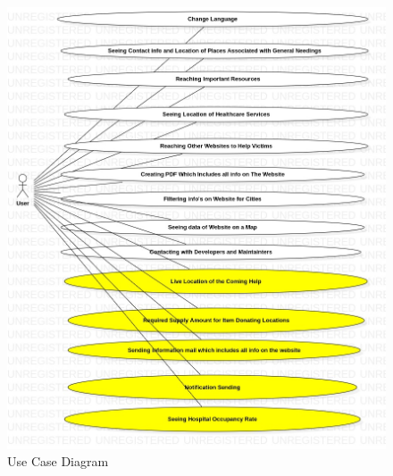 \begin{figure}[H]
    \includegraphics[scale = 0.5  ]{assets/UseCaseDiagramSuggestion.jpg}
    \caption[Use Case Diagram]{Use Case Diagram}
\end{figure}

